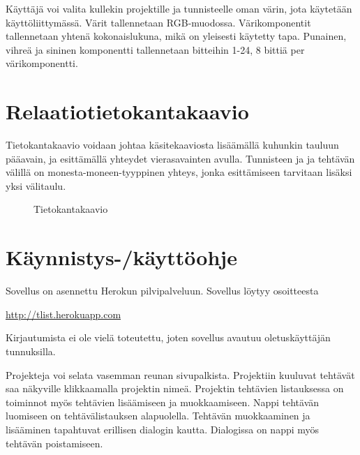 \documentclass[12pt,a4paper,oneside,titlepage,pdftex]{article}
\begin{document}
Käyttäjä voi valita kullekin projektille ja tunnisteelle oman värin, jota käytetään käyttöliittymässä. Värit tallennetaan RGB-muodossa. Värikomponentit tallennetaan yhtenä kokonaislukuna, mikä on yleisesti käytetty tapa. Punainen, vihreä ja sininen komponentti tallennetaan bitteihin 1-24, 8 bittiä per värikomponentti.

\section{Relaatiotietokantakaavio}

Tietokantakaavio voidaan johtaa käsitekaaviosta lisäämällä kuhunkin tauluun pääavain, ja esittämällä yhteydet vierasavainten avulla. Tunnisteen ja ja tehtävän välillä on monesta\hyp{}moneen\hyp{}tyyppinen yhteys, jonka esittämiseen tarvitaan lisäksi yksi välitaulu.

\begin{figure}[htbp]
\begin{center}
\caption{Tietokantakaavio}
\label{tietokantakaavio}
\end{center}
\end{figure}

\section{Käynnistys-/käyttöohje}

Sovellus on asennettu Herokun pilvipalveluun. Sovellus löytyy osoitteesta

\begin{center}\url{http://tlist.herokuapp.com}\end{center}

Kirjautumista ei ole vielä toteutettu, joten sovellus avautuu oletuskäyttäjän tunnuksilla.

Projekteja voi selata vasemman reunan sivupalkista. Projektiin kuuluvat tehtävät saa näkyville klikkaamalla projektin nimeä. Projektin tehtävien listauksessa on toiminnot myös tehtävien lisäämiseen ja muokkaamiseen. Nappi tehtävän luomiseen on tehtävälistauksen alapuolella. Tehtävän muokkaaminen ja lisääminen tapahtuvat erillisen dialogin kautta. Dialogissa on nappi myös tehtävän poistamiseen.
\end{document}
